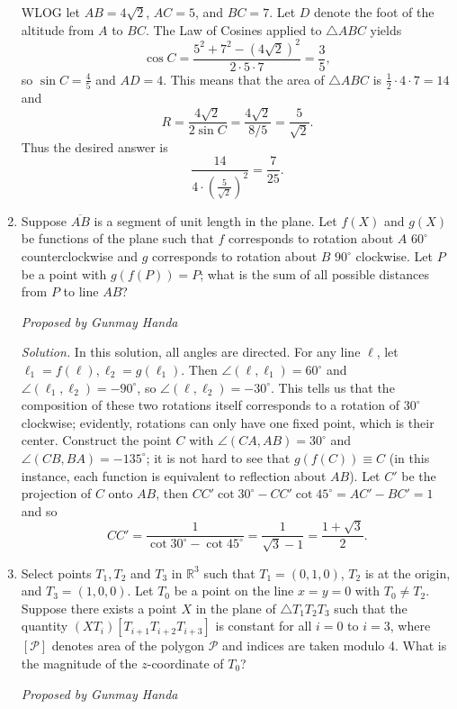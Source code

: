 \documentclass[10pt]{article}
\newcommand{\proposed}[1]
{
\vspace{5pt}
\noindent\textit{Proposed by #1}
}
\newcommand{\solution}
{
\vspace{5pt}
\noindent\textit{Solution.}\qquad
}
\begin{document}
\begin{enumerate}
\par WLOG let $AB=4\sqrt 2$, $AC=5$, and $BC=7$.  Let $D$ denote the foot of the altitude from $A$ to $BC$.  The Law of Cosines applied to $\triangle ABC$ yields \[\cos C = \frac{5^2 + 7^2 - (4\sqrt 2)^2}{2\cdot 5\cdot 7} = \frac{3}{5},\] so $\sin C = \frac 45$ and $AD=4$.  This means that the area of $\triangle ABC$ is $\tfrac12\cdot 4\cdot 7 = 14$ and \[R = \dfrac{4\sqrt 2}{2\sin C} = \frac{4\sqrt 2}{8/5} = \frac{5}{\sqrt 2}.\] Thus the desired answer is \[\frac{14}{4\cdot (\frac{5}{\sqrt 2})^2} = \boxed{\frac{7}{25}}.\]

\item Suppose $\overline{AB}$ is a segment of unit length in the plane. Let $f(X)$ and $g(X)$ be functions of the plane such that $f$ corresponds to rotation about $A$ $60^\circ$ counterclockwise and $g$ corresponds to rotation about $B$ $90^\circ$ clockwise. Let $P$ be a point with $g(f(P))=P$; what is the sum of all possible distances from $P$ to line $AB$?

\proposed{Gunmay Handa}

\solution In this solution, all angles are directed. For any line $\ell$, let $\ell_1=f(\ell), \ell_2=g(\ell_1)$. Then $\angle(\ell,\ell_1)=60^\circ$ and $\angle(\ell_1,\ell_2)=-90^\circ$, so $\angle(\ell,\ell_2)=-30^\circ$. This tells us that the composition of these two rotations itself corresponds to a rotation of $30^\circ$ clockwise; evidently, rotations can only have one fixed point, which is their center. Construct the point $C$ with $\angle(CA,AB)=30^\circ$ and $\angle(CB,BA)=-135^\circ$; it is not hard to see that $g(f(C))\equiv C$ (in this instance, each function is equivalent to reflection about $AB$). Let $C'$ be the projection of $C$ onto $AB$, then $CC'\cot 30^\circ-CC'\cot 45^\circ=AC'-BC'=1$ and so \[CC'=\frac{1}{\cot 30^\circ-\cot 45^\circ}=\frac{1}{\sqrt{3}-1}=\boxed{\frac{1+\sqrt{3}}{2}}.\]

\item Select points $T_1,T_2$ and $T_3$ in $\mathbb{R}^3$ such that $T_1=(0,1,0)$, $T_2$ is at the origin, and $T_3=(1,0,0)$. Let $T_0$ be a point on the line $x=y=0$ with $T_0\neq T_2$. Suppose there exists a point $X$ in the plane of $\triangle T_1T_2T_3$ such that the quantity $(XT_i)[T_{i+1}T_{i+2}T_{i+3}]$ is constant for all $i=0$ to $i=3$, where $[\mathcal{P}]$ denotes area of the polygon $\mathcal{P}$ and indices are taken modulo 4.  What is the magnitude of the $z$-coordinate of $T_0$?

\proposed{Gunmay Handa}


\end{enumerate}
\end{document}
